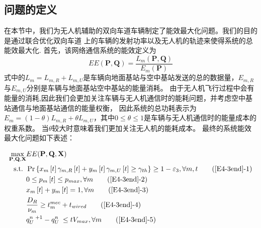 \subsection{问题的定义}\label{section4-2-3}
在本节中，我们为无人机辅助的双向车道车辆制定了能效最大化问题。我们的目的是通过联合优化双向车道
上的车辆的发射功率以及无人机的轨迹来使得系统的总能效最大化.
首先，该网络通信系统的能效定义为
\begin{equation} \label{E4-11}
EE(\mathbf{P}, \mathbf{Q})=
{\frac{{{L}_{m}}\left( \mathbf{P}, \mathbf{Q} \right)}
{{{E}_{m}}\left( \mathbf{P} \right)}}
\end{equation}
式中的${{L}_{m}={L}_{m,R}+{L}_{m,U}}$是车辆向地面基站与空中基站发送的总的数据量，${E}_{m,R}$与${E}_{m,U}$分别是车辆与地面基站空中基站的能量消耗。
由于无人机飞行过程中会有能量的消耗,因此我们会更加关注车辆与无人机通信时的能耗问题，并考虑空中基站通信与地面基站通信的能量权衡，
因此系统的总功耗表示为${{E}_{m}=(1-\theta){L}_{m,R}+\theta{L}_{m,U}}$，其中$0\le \theta \le 1$是车辆与无人机通信时的能量成本的权重系数。
当$\theta$较大时意味着我们更加关注无人机的能耗成本。
最终的系统能效最大化问题如下表述：

\begin{align}
\max _{ \mathbf{P}, \mathbf{Q}, \mathbf{X} }  & EE(\mathbf{P}, \mathbf{Q}, \mathbf{X})                \label{E4-3end}\\
\text { s.t. }
& \Pr\left\{x_m\left[t\right]\gamma_{m,R}\left[t\right]+
y_m\left[t\right]\gamma_{m,U}\left[t\right]\geq \gamma_{th}\right\}\geq1-
\varepsilon_3, \forall m,t                                               \tag{\ref{E4-3end}{-1}}      \label{E4-3end1}\\  %
& 0\le p_m\left[t\right]\le p_{max}, \forall m                           \tag{\ref{E4-3end}{-2}}      \label{E4-3end2}\\  %
& x_m\left[t\right] + y_m\left[t\right]=1, \forall m                     \tag{\ref{E4-3end}{-3}}      \label{E4-3end3}\\  %
& \frac{D_R}{\nu_m} \geq t_{m}^{mec}+t_{wired}                           \tag{\ref{E4-3end}{-4}}      \label{E4-3end4}\\  %
& q_U^{n\mathrm{\ }+1}-q_U^{n\mathrm{\ }}\le tV_{max}, \forall m         \tag{\ref{E4-3end}{-5}}      \label{E4-3end5}    %
\end{align}

